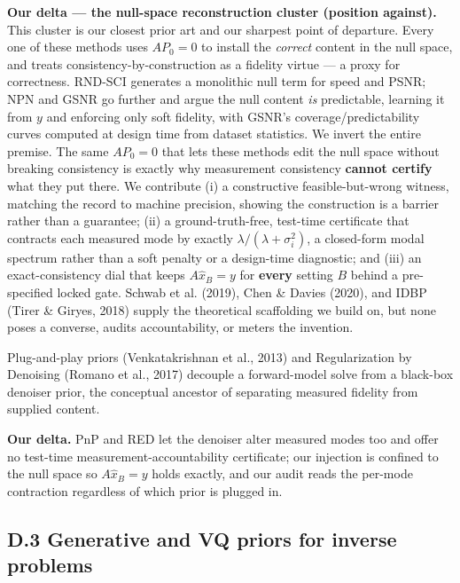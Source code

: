\documentclass[11pt]{article}
\begin{document}
\textbf{Our delta --- the null-space reconstruction cluster (position against).} This cluster is our closest prior art and our sharpest point of departure. Every one of these methods uses $A P_0 = 0$ to install the \textit{correct} content in the null space, and treats consistency-by-construction as a fidelity virtue --- a proxy for correctness. RND-SCI generates a monolithic null term for speed and PSNR; NPN and GSNR go further and argue the null content \textit{is} predictable, learning it from $y$ and enforcing only soft fidelity, with GSNR's coverage/predictability curves computed at design time from dataset statistics. We invert the entire premise. The same $A P_0 = 0$ that lets these methods edit the null space without breaking consistency is exactly why measurement consistency \textbf{cannot certify} what they put there. We contribute (i) a constructive feasible-but-wrong witness, matching the record to machine precision, showing the construction is a barrier rather than a guarantee; (ii) a ground-truth-free, test-time certificate that contracts each measured mode by exactly $\lambda/(\lambda+\sigma_i^2)$, a closed-form modal spectrum rather than a soft penalty or a design-time diagnostic; and (iii) an exact-consistency dial that keeps $A\hat{x}_B = y$ for \textbf{every} setting $B$ behind a pre-specified locked gate. Schwab et al. (2019), Chen \& Davies (2020), and IDBP (Tirer \& Giryes, 2018) supply the theoretical scaffolding we build on, but none poses a converse, audits accountability, or meters the invention.

Plug-and-play priors (Venkatakrishnan et al., 2013) and Regularization by Denoising (Romano et al., 2017) decouple a forward-model solve from a black-box denoiser prior, the conceptual ancestor of separating measured fidelity from supplied content.

\textbf{Our delta.} PnP and RED let the denoiser alter measured modes too and offer no test-time measurement-accountability certificate; our injection is confined to the null space so $A\hat{x}_B = y$ holds exactly, and our audit reads the per-mode contraction regardless of which prior is plugged in.

\subsection*{D.3 Generative and VQ priors for inverse problems}
\end{document}
